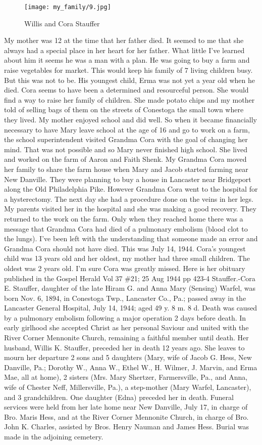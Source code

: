 \begin{figure}
\centering
\texttt{[image: my\_family/9.jpg]}
\caption{Willis and Cora Stauffer}
\label{willis-cora-stauffer}
\end{figure}
My mother was 12 at the time that her father died. It seemed to me that she always had a special place in her heart for her father. What little I've learned about him it seems he was a man with a plan. He was going to buy a farm and raise vegetables for market. This would keep his family of 7 living children busy. But this was not to be. His youngest child, Erma was not yet a year old when he died. 
Cora seems to have been a determined and resourceful person. She would find a way to raise her family of children. She made potato chips and my mother told of selling bags of them on the streets of Conestoga the small town where they lived. My mother enjoyed school and did well. So when it became financially necessary to have Mary leave school at the age of 16 and go to work on a farm, the school superintendent visited Grandma Cora with the goal of changing her mind. That was not possible and so Mary never finished high school. She lived and worked on the farm of Aaron and Faith Shenk.  My Grandma Cora moved her family to share the farm house when Mary and Jacob started farming near New Danville. They were planning to buy a house in Lancaster near Bridgeport along the Old Philadelphia Pike. However Grandma Cora went to the hospital for a hysterectomy. The next day she had a procedure done on the veins in her legs. My parents visited her in the hospital and she was making a good recovery. They returned to the work on the farm. Only when they reached home there was a message that Grandma Cora had died of a pulmonary embolism (blood clot to the lungs). I've been left with the understanding that someone made an error and Grandma Cora should not have died. This was July 14, 1944. Cora's youngest child was 13 years old and her oldest, my mother had three small children. The oldest was 2 years old. I'm sure Cora was greatly missed.
Here is her obituary published in the Gospel Herald Vol 37 \#21; 25 Aug 1944 pp 423-4
Stauffer.-Cora E. Stauffer, daughter of the late Hiram G. and Anna Mary (Sensing) Warfel, was born Nov. 6, 1894, in Conestoga Twp., Lancaster Co., Pa.; passed away in the Lancaster General Hospital, July 14, 1944; aged 49 y. 8 m. 8 d. Death was caused by a pulmonary embolism following a major operation 2 days before death. In early girlhood she accepted Christ as her personal Saviour and united with the River Corner Mennonite Church, remaining a faithful member until death. Her husband, Willis K. Stauffer, preceded her in death 12 years ago. She leaves to mourn her departure 2 sons and 5 daughters (Mary, wife of Jacob G. Hess, New Danville, Pa.; Dorothy W., Anna W., Ethel W., H. Wilmer, J. Marvin, and Erma Mae, all at home), 2 sisters (Mrs. Mary Shertzer, Farmersville, Pa., and Anna, wife of Chester Neff, Millersville, Pa.), a step-mother (Mary Warfel, Lancaster), and 3 grandchildren. One daughter (Edna) preceded her in death. Funeral services were held from her late home near New Danville, July 17, in charge of Bro. Maris Hess, and at the River Corner Mennonite Church, in charge of Bro. John K. Charles, assisted by Bros. Henry Nauman and James Hess. Burial was made in the adjoining cemetery.
